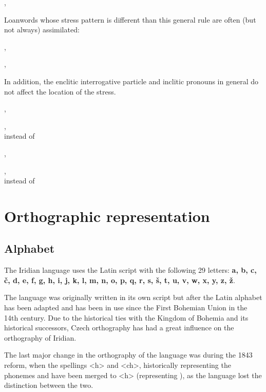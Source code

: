 \a {}, 
\xe

Loanwords whose stress pattern is different than this general rule are often (but not always) assimilated:


\pex
\a {}, \\

\a {}, \\
\xe

In addition, the enclitic interrogative particle  and inclitic pronouns in general do not affect the location of the stress.

\pex
\a {}, \\

\a {}, \\
 instead of 
\xe

\pex
\a {}, \\

\a {}, \\
 instead of 
\xe

\section{Orthographic representation}
\subsection{Alphabet}

\par The Iridian language uses the Latin script with the following 29 letters: \textbf{a, b, c, \v{c}, d, e, f, g, h, i, j, k, l, m, n, o, p, q, r, s, \v{s}, t, u, v, w, x, y, z, \v{z}}.

The language was originally written in its own script but after the Latin alphabet has been adapted and has been in use since the First Bohemian Union in the 14th century. Due to the historical ties with the Kingdom of Bohemia and its historical successors, Czech orthography has had a great influence on the orthography of Iridian.

The last major change in the orthography of the language was during the 1843 reform, when the spellings <h> and <ch>, historically representing the phonemes  and  have been merged to <h> (representing ), as the language lost the distinction between the two.


